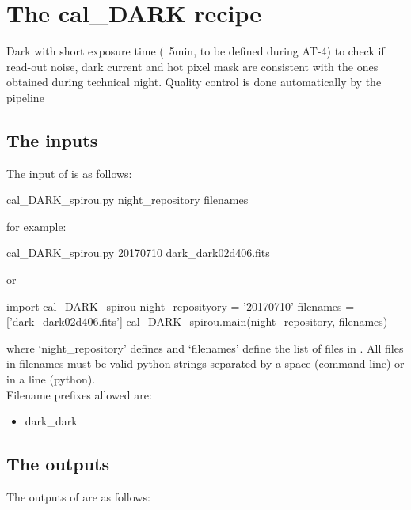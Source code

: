 \section{The cal\_DARK recipe}
\label{ch:the_recipes:cal_DARK_spirou}

Dark with short exposure time (~5min, to be defined during AT-4) to check if read-out noise, dark current and hot pixel mask are consistent with the ones obtained during technical night. Quality control is done automatically by the pipeline \\


\subsection{The inputs}
The input of \calDARK is as follows:
\begin{cmdbox}
cal_DARK_spirou.py  night_repository  filenames
\end{cmdbox}
\noindent for example:
\begin{cmdbox}[title={example}]
cal_DARK_spirou.py 20170710 dark_dark02d406.fits
\end{cmdbox}
\noindent or
\begin{pythonbox}
import cal_DARK_spirou
night_reposityory = '20170710'
filenames = ['dark_dark02d406.fits']
cal_DARK_spirou.main(night_repository, filenames)
\end{pythonbox}

\noindent where `night\_repository' defines \argnightname and `filenames' define the list of files in \argfilenames. All files in filenames must be valid python strings separated by a space (command line) or in a line (python). \\

\noindent Filename prefixes allowed are:
\begin{itemize}
	\item dark\_dark
\end{itemize}

\subsection{The outputs}
The outputs of \calDARK are as follows:

